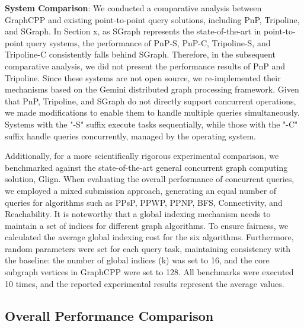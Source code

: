 \documentclass[lettersize,journal]{IEEEtran} %
\begin{document}
{\bf{System Comparison}}: We conducted a comparative analysis between GraphCPP and existing point-to-point query solutions, including PnP\cite{pnp}, Tripoline\cite{tripoline}, and SGraph\cite{sgraph}. In Section x, as SGraph represents the state-of-the-art in point-to-point query systems, the performance of PnP-S, PnP-C, Tripoline-S, and Tripoline-C consistently falls behind SGraph. Therefore, in the subsequent comparative analysis, we did not present the performance results of PnP and Tripoline. Since these systems are not open source, we re-implemented their mechanisms based on the Gemini distributed graph processing framework. Given that PnP, Tripoline, and SGraph do not directly support concurrent operations, we made modifications to enable them to handle multiple queries simultaneously. Systems with the "-S" suffix execute tasks sequentially, while those with the "-C" suffix handle queries concurrently, managed by the operating system.

Additionally, for a more scientifically rigorous experimental comparison, we benchmarked against the state-of-the-art general concurrent graph computing solution, Glign. When evaluating the overall performance of concurrent queries, we employed a mixed submission approach, generating an equal number of queries for algorithms such as PPsP, PPWP, PPNP, BFS, Connectivity, and Reachability. It is noteworthy that a global indexing mechanism needs to maintain a set of indices for different graph algorithms. To ensure fairness, we calculated the average global indexing cost for the six algorithms. Furthermore, random parameters were set for each query task, maintaining consistency with the baseline: the number of global indices (k) was set to 16, and the core subgraph vertices in GraphCPP were set to 128. All benchmarks were executed 10 times, and the reported experimental results represent the average values.
 

\subsection{Overall Performance Comparison}
\end{document}
